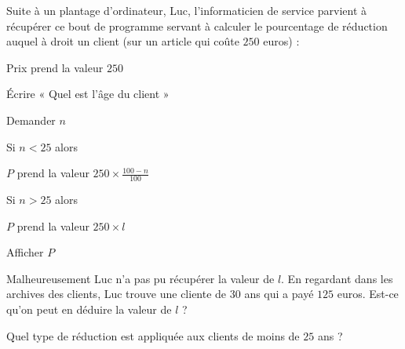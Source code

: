 
\begin{exercice}\label{exosmath-0555}

Suite à un plantage d'ordinateur, Luc, l'informaticien de service parvient à récupérer ce bout de programme servant à calculer le pourcentage de réduction auquel à droit un client (sur un article qui coûte \( 250\) euros) :
\begin{fmpage}{0.9\linewidth}

    Prix prend la valeur \( 250\)

    Écrire « Quel est l'âge du client » 

    Demander \( n\)

    Si \( n < 25\) alors

    \hspace{1cm} \( P\) prend la valeur \( 250\times \frac{ 100-n }{ 100 }\)

    Si \( n > 25 \) alors

    \hspace{1cm} \( P\) prend la valeur \( 250\times l\)

    Afficher \( P\)

\end{fmpage}

Malheureusement Luc n'a pas pu récupérer la valeur de \( l\). En regardant dans les archives des clients, Luc trouve une cliente de \( 30\) ans qui a payé \( 125\) euros. Est-ce qu'on peut en déduire la valeur de \( l\) ?

Quel type de réduction est appliquée aux clients de moins de \( 25\) ans ?

\end{exercice}
